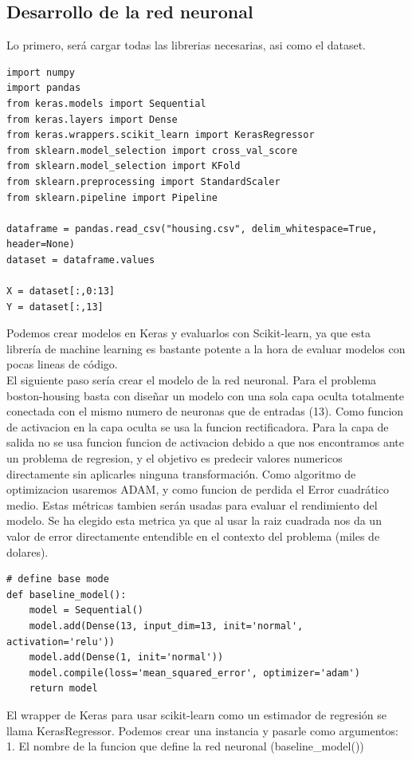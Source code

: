 \subsection{Desarrollo de la red neuronal}
Lo primero, será cargar todas las librerias necesarias, asi como el dataset.
\begin{verbatim}
import numpy
import pandas
from keras.models import Sequential
from keras.layers import Dense
from keras.wrappers.scikit_learn import KerasRegressor
from sklearn.model_selection import cross_val_score
from sklearn.model_selection import KFold
from sklearn.preprocessing import StandardScaler
from sklearn.pipeline import Pipeline

dataframe = pandas.read_csv("housing.csv", delim_whitespace=True, header=None)
dataset = dataframe.values

X = dataset[:,0:13]
Y = dataset[:,13]
\end{verbatim}
Podemos crear modelos en Keras y evaluarlos con Scikit-learn, ya que esta librería de machine learning es bastante potente a la hora de evaluar modelos con pocas lineas de código.\\
El siguiente paso sería crear el modelo de la red neuronal. Para el problema boston-housing basta con diseñar un modelo con una sola capa oculta totalmente conectada con el mismo numero de neuronas que de entradas (13). Como funcion de activacion en la capa oculta se usa la funcion rectificadora. Para la capa de salida no se usa funcion funcion de activacion debido a que nos encontramos ante un problema de regresion, y el objetivo es predecir valores numericos directamente sin aplicarles ninguna transformación. Como algoritmo de optimizacion usaremos ADAM, y como funcion de perdida el Error cuadrático medio. Estas métricas tambien serán usadas para evaluar el rendimiento del modelo. Se ha elegido esta metrica ya que al usar la raiz cuadrada nos da un valor de error directamente entendible en el contexto del problema (miles de dolares).
\begin{verbatim}
# define base mode
def baseline_model():
	model = Sequential()
	model.add(Dense(13, input_dim=13, init='normal', activation='relu'))
	model.add(Dense(1, init='normal'))
	model.compile(loss='mean_squared_error', optimizer='adam')
	return model
\end{verbatim}
El wrapper de Keras para usar scikit-learn como un estimador de regresión se llama KerasRegressor. Podemos crear una instancia y pasarle como argumentos:\\
1. El nombre de la funcion que define la red neuronal (baseline\_model())\\
